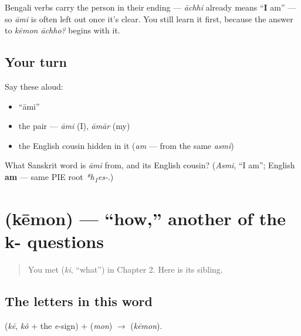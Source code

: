 \begin{grammarlens}[title={Grammar Lens: \textquotedblleft{}I\textquotedblright{} can often be dropped}]
Bengali verbs carry the person in their ending — \emph{āchhi} already means \textquotedblleft{}\textbf{I} am\textquotedblright{} — so \emph{āmi} is often left out once it's clear. You still learn it first, because the answer to \emph{kēmon āchho?} begins with it.
\end{grammarlens}

\subsection*{Your turn}
Say these aloud:

\begin{itemize}
\raggedright
  \item \textquotedblleft{}āmi\textquotedblright{}
  \item the pair — \emph{āmi} (I), \emph{āmār} (my)
  \item the English cousin hidden in it (\emph{am} — from the same \emph{asmi})
\end{itemize}

\begin{tcolorbox}[breakable,colback=teal!4,colframe=teal!35!black,title={Before you move on}]
What Sanskrit word is \emph{āmi} from, and its English cousin? (\emph{Asmi}, \textquotedblleft{}I am\textquotedblright{}; English \textbf{am} — same PIE root \emph{*h\textsubscript{1}es-}.)
\end{tcolorbox}
\section[\bn{কেমন}]{ (kēmon) — \textquotedblleft{}how,\textquotedblright{} another of the k- questions}

\label{lesson:BN-C03-kemon}



\begin{quote}
You met \textbf{} (\emph{ki}, \textquotedblleft{}what\textquotedblright{}) in Chapter 2. Here is its sibling.
\end{quote}

\subsection*{The letters in this word}
\textbf{} (\emph{kē}, \emph{kô} + the \emph{e}-sign) + \textbf{} (\emph{mon}) $\to$ \textbf{} (\emph{kēmon}).

